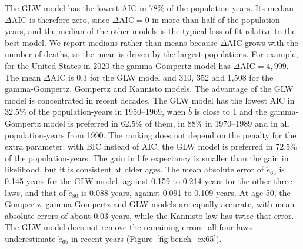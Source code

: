 \documentclass[12pt]{article}
\begin{document}
The GLW model has the lowest AIC in 78\% of the population-years. Its median $\Delta\mathrm{AIC}$ is therefore zero, since $\Delta\mathrm{AIC}=0$ in more than half of the population-years, and the median of the other models is the typical loss of fit relative to the best model. We report medians rather than means because $\Delta\mathrm{AIC}$ grows with the number of deaths, so the mean is driven by the largest populations. For example, for the United States in 2020 the gamma-Gompertz model has $\Delta\mathrm{AIC}=4{,}999$. The mean $\Delta\mathrm{AIC}$ is 0.3 for the GLW model and 310, 352 and 1{,}508 for the gamma-Gompertz, Gompertz and Kannisto models. The advantage of the GLW model is concentrated in recent decades. The GLW model has the lowest AIC in 32.5\% of the population-years in 1950--1969, when $\hat b$ is close to 1 and the gamma-Gompertz model is preferred in 62.5\% of them, in 88\% in 1970--1989 and in all population-years from 1990. The ranking does not depend on the penalty for the extra parameter: with BIC instead of AIC, the GLW model is preferred in 72.5\% of the population-years. The gain in life expectancy is smaller than the gain in likelihood, but it is consistent at older ages. The mean absolute error of $\mathring{e}_{65}$ is 0.145 years for the GLW model, against 0.159 to 0.214 years for the other three laws, and that of $\mathring{e}_{80}$ is 0.088 years, against 0.091 to 0.109 years. At age 50, the Gompertz, gamma-Gompertz and GLW models are equally accurate, with mean absolute errors of about 0.03 years, while the Kannisto law has twice that error. The GLW model does not remove the remaining errors: all four laws underestimate $\mathring{e}_{65}$ in recent years (Figure~\ref{fig:bench_ex65}).
\end{document}
